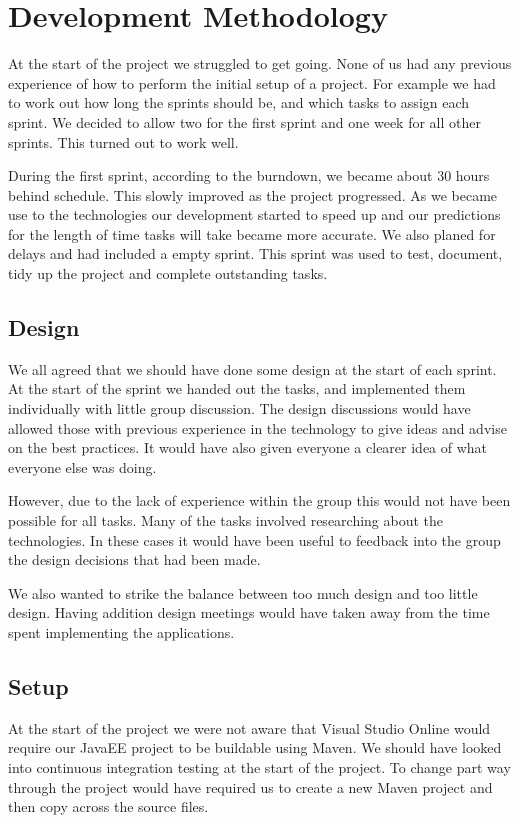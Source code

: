 \section{Development Methodology}

At the start of the project we struggled to get going. None of us had any previous experience of how to perform the initial setup of a project. For example we had to work out how long the sprints should be, and which tasks to assign each sprint. We decided to allow two for the first sprint and one week for all other sprints. This turned out to work well. 

During the first sprint, according to the burndown, we became about 30 hours behind schedule. This slowly improved as the project progressed. As we became use to the technologies our development started to speed up and our predictions for the length of time tasks will take became more accurate. We also planed for delays and had included a empty sprint. This sprint was used to test, document, tidy up the project and complete outstanding tasks.

\subsection{Design}
We all agreed that we should have done some design at the start of each sprint. At the start of the sprint we handed out the tasks, and implemented them individually with little group discussion. The design discussions would have allowed those with previous experience in the technology to give ideas and advise on the best practices. It would have also given everyone a clearer idea of what everyone else was doing.

However, due to the lack of experience within the group this would not have been possible for all tasks. Many of the tasks involved researching about the technologies. In these cases it would have been useful to feedback into the group the design decisions that had been made.

We also wanted to strike the balance between too much design and too little design. Having addition design meetings would have taken away from the time spent implementing the applications. 

\subsection{Setup}

At the start of the project we were not aware that Visual Studio Online would require our JavaEE project to be buildable using Maven. We should have looked into continuous integration testing at the start of the project. To change part way through the project would have required us to create a new Maven project and then copy across the source files.

